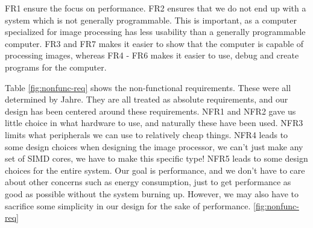 {\sc FR1} ensure the focus on performance. {\sc FR2} ensures that we do not end
up with a system which is not generally programmable. This is important, as a
computer specialized for image processing has less usability than a generally
programmable computer. {\sc FR3} and {\sc FR7} makes it easier to show that the
computer is capable of processing images, whereas {\sc FR4 - FR6} makes it
easier to use, debug and create programs for the computer.



Table \ref{fig:nonfunc-req} shows the non-functional requirements. These were
all determined by Jahre. They are all treated as absolute requirements, and our
design has been centered around these requirements. {\sc NFR1} and {\sc NFR2} gave us little
choice in what hardware to use, and naturally these have been used. {\sc NFR3} limits
what peripherals we can use to relatively cheap things. {\sc NFR4} leads to some design
choices when designing the image processor, we can't just make any set of SIMD cores, we have
to make this specific type!  {\sc NFR5} leads to some design choices for the entire system.
Our goal is performance, and we don't have to care about other concerns such as energy
consumption, just to get performance as good as possible without the system burning up.
However, we may also have to sacrifice some simplicity in our design for the sake of performance.
\ref{fig:nonfunc-req}
